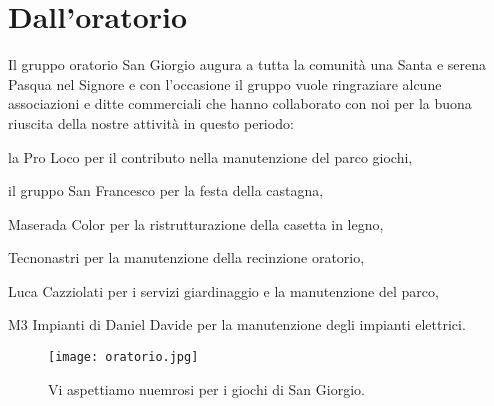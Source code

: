 \section{Dall'oratorio}

Il gruppo oratorio San Giorgio augura a tutta la comunità una Santa e serena Pasqua nel Signore e con l'occasione il gruppo vuole ringraziare alcune associazioni e ditte commerciali che hanno collaborato con noi per la buona riuscita della nostre attività in questo periodo:

la Pro Loco per il contributo nella manutenzione del parco giochi,

il gruppo San Francesco per la festa della castagna,

Maserada Color per la ristrutturazione della casetta in legno,

Tecnonastri per la manutenzione della recinzione oratorio,

Luca Cazziolati per i servizi giardinaggio e la manutenzione del parco,

M3 Impianti di Daniel Davide per la manutenzione degli impianti elettrici.


\vspace*{\fill}
\begin{figure}[h]
    \centering
    \texttt{[image: oratorio.jpg]}
    \caption{Vi aspettiamo nuemrosi per i giochi di San Giorgio.}
\end{figure}
